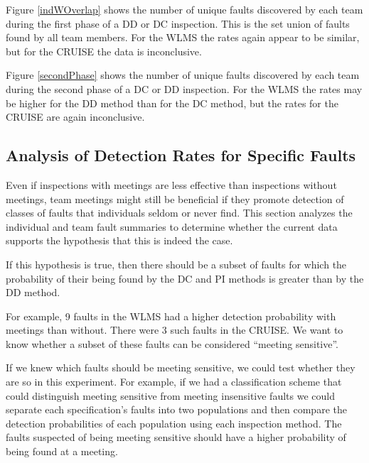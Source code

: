 %



Figure \ref{indWOverlap} shows the number of unique faults 
discovered by each team during the first phase of a DD or DC
inspection. This is the set union of 
faults found by all team members. For the WLMS the rates again 
appear to be similar, but for the CRUISE the data is inconclusive.



Figure \ref{secondPhase} shows the number of unique faults
discovered by each team during the second phase of a DC or DD 
inspection. For the WLMS the rates may be higher for the DD
method than for the  DC method, but the rates for the CRUISE
are again inconclusive.
 

\subsection{Analysis of Detection Rates for Specific Faults}

Even if inspections with meetings are less effective than 
inspections without meetings, team meetings might still be beneficial if
they promote detection of classes of faults that individuals seldom 
or never find.
This section analyzes the individual and team fault summaries
to determine whether the current data supports the hypothesis that
this is indeed the case. 

If this hypothesis is true, then there should be a subset of 
faults for which the probability of their being found by 
the DC and PI methods is greater than by the  DD method. 

For example, 9 faults in the WLMS had a higher detection probability  
with meetings than without. There were 3 such faults in the CRUISE.
We want to know whether a subset of these faults can be considered
``meeting sensitive''. 

If we knew which faults should be meeting sensitive, we could test 
whether they are so in this experiment. 
For example, if we had  
a classification scheme that could distinguish meeting sensitive 
from meeting insensitive faults we could 
separate each specification's faults into two 
populations and then compare the detection 
probabilities of each population using each inspection method.
The faults suspected of being meeting sensitive should have a higher
probability of being found at a meeting.

